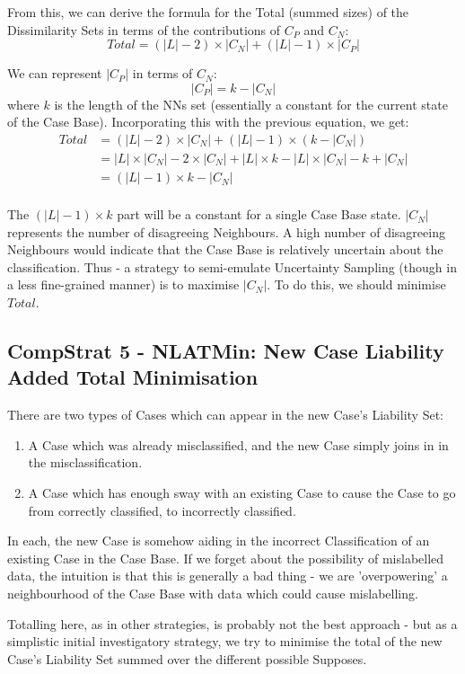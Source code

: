 \documentclass[a4paper,11pt]{report}
\begin{document}
From this, we can derive the formula for the Total (summed sizes) of the Dissimilarity Sets in terms of the contributions of $C_{P}$ and $C_{N}$:
\[ Total= (|L| - 2)\times |C_{N}| +(|L| - 1)\times |C_{P}|  \] 

We can represent $|C_{P}|$ in terms of $C_{N}$:
\[ |C_{P}| = k -  |C_{N}| \]
where $k$ is the length of the NNs set (essentially a constant for the current state of the Case Base). Incorporating this with the previous equation, we get:
\begin{align*}
Total &= (|L| - 2)\times |C_{N}| +(|L| - 1)\times (k - |C_{N}|) \\
&= |L| \times |C_{N}| - 2\times|C_{N}| + |L|\times k - |L| \times |C_{N}| - k + |C_{N}| \\
&= (|L| - 1) \times k - |C_{N}| \\
\end{align*} 

The $ (|L| - 1) \times k $ part will be a constant for a single Case Base state. $|C_{N}|$ represents the number of disagreeing Neighbours. A high number of disagreeing Neighbours would indicate that the Case Base is relatively uncertain about the classification. Thus - a strategy to semi-emulate Uncertainty Sampling (though in a less fine-grained manner) is to maximise $|C_{N}|$. To do this, we should minimise $Total$.

\subsection{CompStrat 5 - NLATMin: New Case Liability Added Total Minimisation}
There are two types of Cases which can appear in the new Case's Liability Set:
\begin{enumerate}
	\item A Case which was already misclassified, and the new Case simply joins in in the misclassification.
	\item A Case which has enough sway with an existing Case to cause the Case to go from correctly classified, to incorrectly classified.
\end{enumerate}

In each, the new Case is somehow aiding in the incorrect Classification of an existing Case in the Case Base. If we forget about the possibility of mislabelled data, the intuition is that this is generally a bad thing - we are 'overpowering' a neighbourhood of the Case Base with data which could cause mislabelling.

Totalling here, as in other strategies, is probably not the best approach - but as a simplistic initial investigatory strategy, we try to minimise the total of the new Case's Liability Set summed over the different possible Supposes.
\end{document}
